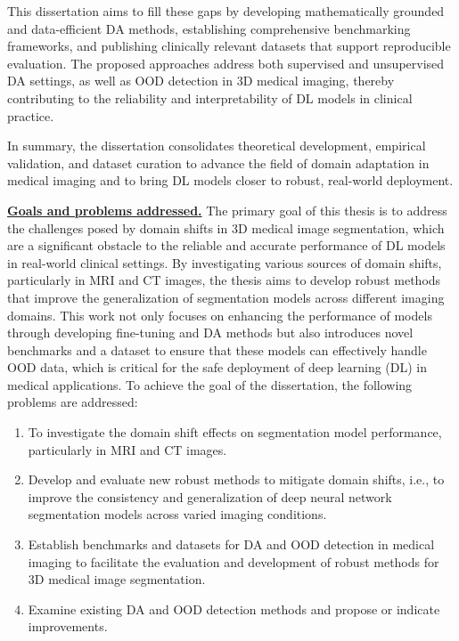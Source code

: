 This dissertation aims to fill these gaps by developing mathematically grounded and data-efficient DA methods, establishing comprehensive benchmarking frameworks, and publishing clinically relevant datasets that support reproducible evaluation. The proposed approaches address both supervised and unsupervised DA settings, as well as OOD detection in 3D medical imaging, thereby contributing to the reliability and interpretability of DL models in clinical practice.

In summary, the dissertation consolidates theoretical development, empirical validation, and dataset curation to advance the field of domain adaptation in medical imaging and to bring DL models closer to robust, real-world deployment.


\underline{\textbf{Goals and problems addressed.}}
The primary goal of this thesis is to address the challenges posed by domain shifts in 3D medical image segmentation, which are a significant obstacle to the reliable and accurate performance of DL models in real-world clinical settings. By investigating various sources of domain shifts, particularly in MRI and CT images, the thesis aims to develop robust methods that improve the generalization of segmentation models across different imaging domains. This work not only focuses on enhancing the performance of models through developing fine-tuning and DA methods but also introduces novel benchmarks and a dataset to ensure that these models can effectively handle OOD data, which is critical for the safe deployment of deep learning (DL) in medical applications. To achieve the goal of the dissertation, the following problems are addressed:

\begin{enumerate}
	\item To investigate the domain shift effects on segmentation model performance, particularly in MRI and CT images.
	\item Develop and evaluate new robust methods to mitigate domain shifts, i.e., to improve the consistency and generalization of deep neural network segmentation models across varied imaging conditions.
	\item Establish benchmarks and datasets for DA and OOD detection in medical imaging to facilitate the evaluation and development of robust methods for 3D medical image segmentation.
	\item Examine existing DA and OOD detection methods and propose or indicate improvements.
\end{enumerate}


